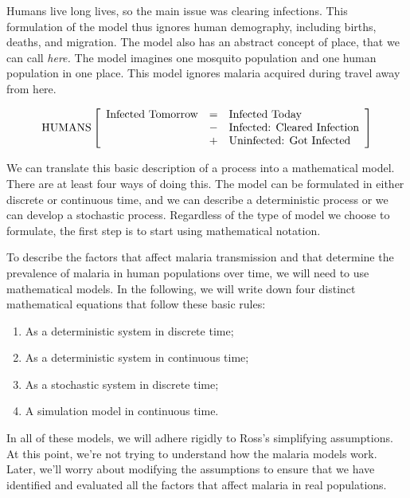 \documentclass[
]{book}
\begin{document}
Humans live long lives, so the main issue was clearing infections. This formulation of the model thus ignores human demography, including births, deaths, and migration. The model also has an abstract concept of place, that we can call \emph{here.} The model imagines one mosquito population and one human population in one place. This model ignores malaria acquired during travel away from here.

\[
\mbox{HUMANS} 
\\ \; \\
\left[
\begin{array}{rcl}
\mbox{Infected Tomorrow} &=& \mbox{Infected Today} \;\; \\
&-& \mbox{Infected: Cleared Infection}\\
&+& \mbox{Uninfected: Got Infected}\\
\end{array} \right]
\]

We can translate this basic description of a process into a mathematical model. There are at least four ways of doing this. The model can be formulated in either discrete or continuous time, and we can describe a deterministic process or we can develop a stochastic process. Regardless of the type of model we choose to formulate, the first step is to start using mathematical notation.

To describe the factors that affect malaria transmission and that determine the prevalence of malaria in human populations over time, we will need to use mathematical models. In the following, we will write down four distinct mathematical equations that follow these basic rules:

\begin{enumerate}
\def\labelenumi{\arabic{enumi}.}
\item
  As a deterministic system in discrete time;
\item
  As a deterministic system in continuous time;
\item
  As a stochastic system in discrete time;
\item
  A simulation model in continuous time.
\end{enumerate}

In all of these models, we will adhere rigidly to Ross's simplifying assumptions. At this point, we're not trying to understand how the malaria models work. Later, we'll worry about modifying the assumptions to ensure that we have identified and evaluated all the factors that affect malaria in real populations.
\end{document}
